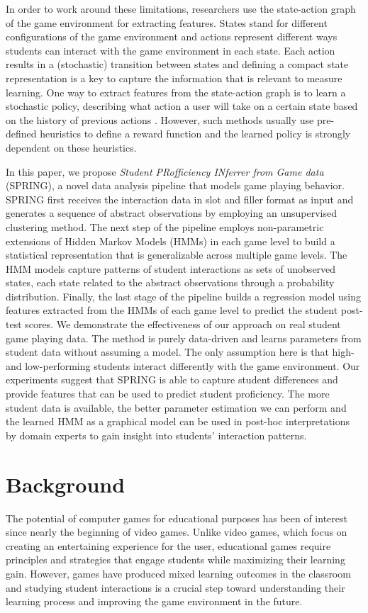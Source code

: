 \documentclass{sigchi}
\def\algname{SPRING\xspace}
\begin{document}
In order to work around these limitations, researchers use the state-action graph of the game environment for extracting features. 
States stand for different configurations of the game environment and actions represent different ways students can interact with the game environment in each state.
Each action results in a (stochastic) transition between states and defining a compact state representation is a key to capture the information that is relevant to measure learning.
One way to extract features from the state-action graph is to learn a stochastic policy, describing what action a user will take on a certain state based on the history of previous actions \cite{lee2014learning, liu2013predicting}.
However, such methods usually use pre-defined heuristics to define a reward function and the learned policy is strongly dependent on these
heuristics.

In this paper, we propose \textit{Student PRofficiency INferrer from Game data} (SPRING), a novel data analysis pipeline that models game playing behavior.
\algname first receives the interaction data in slot and filler format as input and generates a sequence of abstract observations by employing an unsupervised clustering method. 
The next step of the pipeline employs non-parametric extensions of Hidden Markov Models (HMMs) in each game level to build a statistical representation that is generalizable across multiple game levels. 
The HMM models capture patterns of student interactions as sets of unobserved states, each state related to the abstract observations through a probability distribution. 
Finally, the last stage of the pipeline builds a regression model using features extracted from the HMMs of each game level to predict the student post-test scores.
We demonstrate the effectiveness of our approach on real student game playing data.
The method is purely data-driven and learns parameters from student data without assuming a model. 
The only assumption here is that high- and low-performing students interact differently with the game environment.
Our experiments suggest that \algname is able to capture student differences and provide features that can be used to predict student proficiency.
The more student data is available, the better parameter estimation we can perform and the learned HMM as a graphical model can be used in post-hoc interpretations by domain experts to gain insight into students' interaction patterns.

\section{Background}
The potential of computer games for educational purposes has been of interest since nearly the beginning of video games. Unlike video games, which focus on creating an entertaining experience for the user, educational games require principles and strategies that engage students while maximizing their learning gain. However, games have produced mixed learning outcomes in the classroom \cite{harpstead2013search,mayo2009video} and studying student interactions is a crucial step toward understanding their learning process and improving the game environment in the future.
\end{document}
